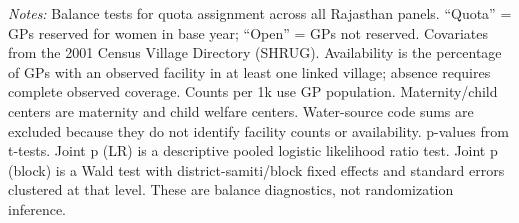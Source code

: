 \begin{table}[htbp]
\vspace{0.5ex}
\parbox{\linewidth}{\scriptsize \emph{Notes:} Balance tests for quota assignment across all Rajasthan panels. ``Quota'' = GPs reserved for women in base year; ``Open'' = GPs not reserved. Covariates from the 2001 Census Village Directory (SHRUG). Availability is the percentage of GPs with an observed facility in at least one linked village; absence requires complete observed coverage. Counts per 1k use GP population. Maternity/child centers are maternity and child welfare centers. Water-source code sums are excluded because they do not identify facility counts or availability. p-values from t-tests. Joint p (LR) is a descriptive pooled logistic likelihood ratio test. Joint p (block) is a Wald test with district-samiti/block fixed effects and standard errors clustered at that level. These are balance diagnostics, not randomization inference.}
\end{table}
